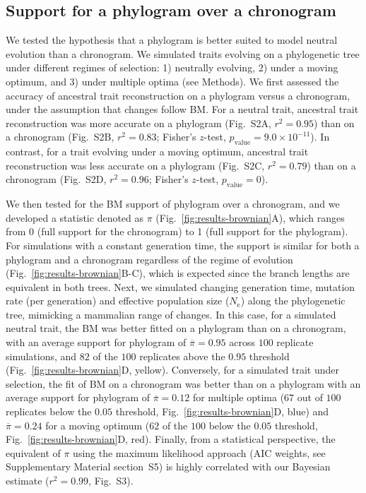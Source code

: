 \documentclass{article}
\newcommand{\Ne}{N_{\text{e}}}
\newcommand{\PhyloSupport}{\pi}
\newcommand{\MeanPhyloSupport}{\overline{\PhyloSupport}}
\begin{document}
\subsection*{Support for a phylogram over a chronogram}
We tested the hypothesis that a phylogram is better suited to model neutral evolution than a chronogram.
We simulated traits evolving on a phylogenetic tree under different regimes of selection: 1) neutrally evolving, 2) under a moving optimum, and 3) under multiple optima (see Methods).
We first assessed the accuracy of ancestral trait reconstruction on a phylogram versus a chronogram, under the assumption that changes follow BM.
For a neutral trait, ancestral trait reconstruction was more accurate on a phylogram (Fig.~S2A, $r^2=0.95$) than on a chronogram (Fig.~S2B, $r^2=0.83$; Fisher's $z$-test, $p_{\text{value}}=9.0\times 10^{-11}$).
In contrast, for a trait evolving under a moving optimum, ancestral trait reconstruction was less accurate on a phylogram (Fig.~S2C, $r^2=0.79$) than on a chronogram (Fig.~S2D, $r^2=0.96$; Fisher's $z$-test, $p_{\text{value}}=0$).

We then tested for the BM support of phylogram over a chronogram, and we developed a statistic denoted as $\PhyloSupport$ (Fig.~\ref{fig:results-brownian}A), which ranges from 0 (full support for the chronogram) to 1 (full support for the phylogram).
For simulations with a constant generation time, the support is similar for both a phylogram and a chronogram regardless of the regime of evolution (Fig.~\ref{fig:results-brownian}B-C), which is expected since the branch lengths are equivalent in both trees.
Next, we simulated changing generation time, mutation rate (per generation) and effective population size ($\Ne$) along the phylogenetic tree, mimicking a mammalian range of changes.
In this case, for a simulated neutral trait, the BM was better fitted on a phylogram than on a chronogram, with an average support for phylogram of $\MeanPhyloSupport = 0.95$ across $100$ replicate simulations, and $82$ of the $100$ replicates above the $0.95$ threshold (Fig.~\ref{fig:results-brownian}D, yellow).
Conversely, for a simulated trait under selection, the fit of BM on a chronogram was better than on a phylogram with an average support for phylogram of $\MeanPhyloSupport = 0.12$ for multiple optima ($67$ out of $100$ replicates below the $0.05$ threshold, Fig.~\ref{fig:results-brownian}D, blue) and $\MeanPhyloSupport = 0.24$ for a moving optimum ($62$ of the $100$ below the $0.05$ threshold, Fig.~\ref{fig:results-brownian}D, red).
Finally, from a statistical perspective, the equivalent of $\PhyloSupport$ using the maximum likelihood approach (AIC weights, see Supplementary Material section~S5) is highly correlated with our Bayesian estimate ($r^2=0.99$, Fig.~S3).
\end{document}
